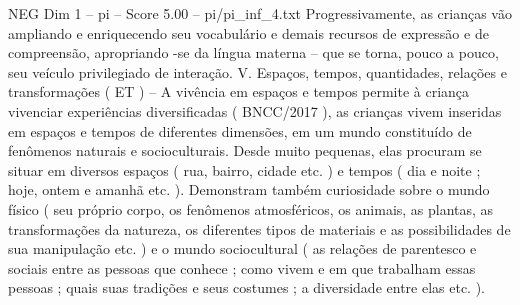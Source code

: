 \begin{textsample}{NEG Dim 1 – pi – Score 5.00 – pi/pi\_inf\_4.txt}
Progressivamente, as crianças vão ampliando e enriquecendo seu vocabulário e demais recursos de expressão e de compreensão, apropriando -se da língua materna – que se torna, pouco a pouco, seu veículo privilegiado de interação.
V.
Espaços, tempos, quantidades, relações e transformações ( ET ) – A vivência em espaços e tempos permite à criança vivenciar experiências diversificadas ( BNCC/2017 ), as crianças vivem inseridas em espaços e tempos de diferentes dimensões, em um mundo constituído de fenômenos naturais e socioculturais.
Desde muito pequenas, elas procuram se situar em diversos espaços ( rua, bairro, cidade etc. ) e tempos ( dia e noite ; hoje, ontem e amanhã etc. ).
Demonstram também curiosidade sobre o mundo físico ( seu próprio corpo, os fenômenos atmosféricos, os animais, as plantas, as transformações da natureza, os diferentes tipos de materiais e as possibilidades de sua manipulação etc. ) e o mundo sociocultural ( as relações de parentesco e sociais entre as pessoas que conhece ; como vivem e em que trabalham essas pessoas ; quais suas tradições e seus costumes ; a diversidade entre elas etc. ).

\end{textsample}
